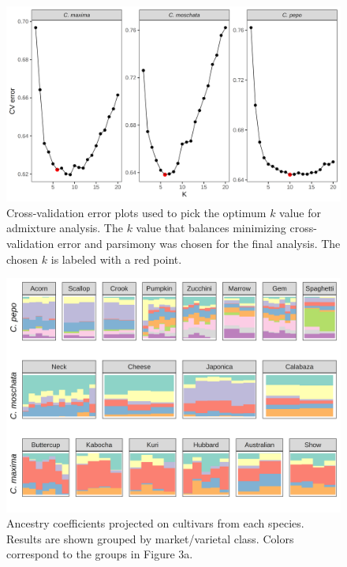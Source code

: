 \documentclass[utf8]{FrontiersinHarvard} %
\begin{document}
\clearpage

\begin{figure}[h]
	\begin{center}
		\includegraphics[width=\textwidth]{../final_figures/04_fig.png}
	\end{center}
	\caption{Cross-validation error plots used to pick the optimum $k$ value for admixture analysis. The $k$ value that balances minimizing cross-validation error and parsimony was chosen for the final analysis. The chosen $k$ is labeled with a red point. \label{fig:4}}
\end{figure}

\clearpage

\begin{figure}[h]
	\begin{center}
		\includegraphics[width=\textwidth]{../final_figures/05_fig.png}
	\end{center}
	\caption{Ancestry coefficients projected on cultivars from each species. Results are shown grouped by market/varietal class. Colors correspond to the groups in Figure 3a. \label{fig:5}}
\end{figure}
\end{document}
